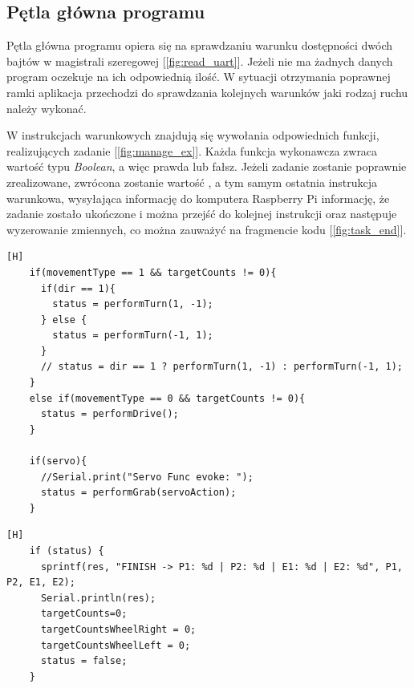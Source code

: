 \subsection{Pętla główna programu}

Pętla główna programu opiera się na sprawdzaniu warunku dostępności dwóch bajtów w magistrali szeregowej [\ref{fig:read_uart}]. Jeżeli nie ma żadnych danych program oczekuje na ich odpowiednią ilość. W sytuacji otrzymania poprawnej ramki aplikacja przechodzi do sprawdzania kolejnych warunków jaki rodzaj ruchu należy wykonać.

W instrukcjach warunkowych znajdują się wywołania odpowiednich funkcji, realizujących zadanie [\ref{fig:manage_ex}]. Każda funkcja wykonawcza zwraca wartość typu \textit{Boolean}, a więc prawda lub fałsz. Jeżeli zadanie zostanie poprawnie zrealizowane, zwrócona zostanie wartość , a tym samym ostatnia instrukcja warunkowa, wysyłająca informację do komputera Raspberry Pi informację, że zadanie zostało ukończone i można przejść do kolejnej instrukcji oraz następuje wyzerowanie zmiennych, co można zauważyć na fragmencie kodu [\ref{fig:task_end}]. 

\vspace*{0.5cm}


\begin{lstlisting}[caption=Fragment przedstawiający logikę zarządzania otrzymanym zadaniem, label=fig:manage_ex, captionpos=b][H]
    if(movementType == 1 && targetCounts != 0){
      if(dir == 1){
        status = performTurn(1, -1);
      } else {
        status = performTurn(-1, 1);
      }
      // status = dir == 1 ? performTurn(1, -1) : performTurn(-1, 1);
    }
    else if(movementType == 0 && targetCounts != 0){
      status = performDrive();
    }
    
    if(servo){
      //Serial.print("Servo Func evoke: ");
      status = performGrab(servoAction);
    }
\end{lstlisting}

\vspace*{0.5cm}


\begin{lstlisting}[caption=Fragment kodu kończący wykonywanie aktualnej komendy, label=fig:task_end, captionpos=b][H]
    if (status) {
      sprintf(res, "FINISH -> P1: %d | P2: %d | E1: %d | E2: %d", P1, P2, E1, E2);
      Serial.println(res);
      targetCounts=0;
      targetCountsWheelRight = 0;
      targetCountsWheelLeft = 0;
      status = false;
    }
\end{lstlisting}


